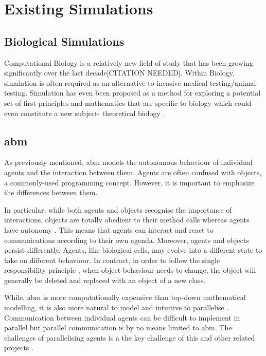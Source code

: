 \documentclass{UoYCSproject}
\begin{document}
\section{Existing Simulations}

\subsection{Biological Simulations}
Computational Biology is a relatively new field of study that has been growing significantly over the last decade[CITATION NEEDED].
Within Biology, simulation is often required as an alternative to invasive medical testing/animal testing.%
Simulation has even been proposed as a method for exploring a potential set of first principles and mathematics that are specific to biology which could even constitute a new subject- theoretical biology \cite{rise_article}.

\subsection{\acrlong{abm}}
\label{abm}
As previously mentioned, \gls{abm} models the autonomous behaviour of individual agents and the interaction between them.
Agents are often confused with objects, a commonly-used programming concept.
However, it is important to emphasize the differences between them.

In particular, while both agents and objects recognise the importance of interactions, objects are totally obedient to their method calls whereas agents have autonomy \cite{abm_v_objects}.
This means that agents can interact and react to communications according to their own agenda.
Moreover, agents and objects persist differently.
Agents, like biological cells, may evolve into a different state to take on different behaviour.
In contract, in order to follow the single responsibility principle \cite[p.95]{srp}, when object behaviour needs to change, the object will generally be deleted and replaced with an object of a new class.

While, \acrlong{abm} is more computationally expensive than top-down mathematical modelling, it is also more natural to model and intuitive to parallelise \cite{flame_simulation}.
Communication between individual agents can be difficult to implement in parallel but parallel communication is by no means limited to \gls{abm}.
The challenges of parallelising agents is a the key challenge of this and other related projects \cite{andy_proj, jeff_proj}.
\end{document}
